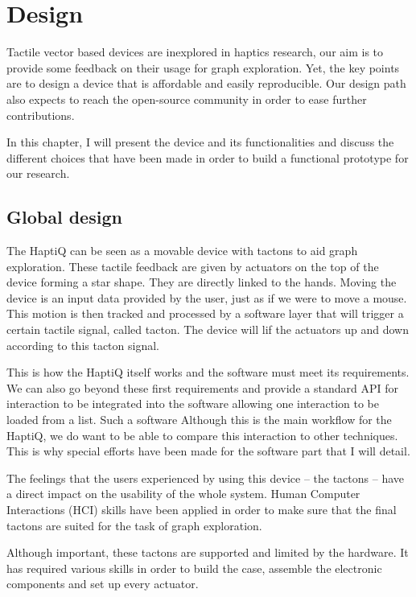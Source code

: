 \chapter{Design}

Tactile vector based devices are inexplored in haptics research, our aim is to provide some feedback on their usage for graph exploration. Yet, the key points are to design a device that is affordable and easily reproducible. Our design path also expects to reach the open-source community in order to ease further contributions.

In this chapter, I will present the device and its functionalities and discuss the different choices that have been made in order to build a functional prototype for our research.

\section{Global design}\label{global-design}

The HaptiQ can be seen as a movable device with tactons to aid graph
exploration. These tactile feedback are given by actuators on the top of
the device forming a star shape. They are directly linked to the hands.
Moving the device is an input data provided by the user, just as if we
were to move a mouse. This motion is then tracked and processed by a
software layer that will trigger a certain tactile signal, called
tacton. The device will lif the actuators up and down according to this
tacton signal.

This is how the HaptiQ itself works and the software must meet its
requirements. We can also go beyond these first requirements and provide
a standard API for interaction to be integrated into the software
allowing one interaction to be loaded from a list. Such a software
Although this is the main workflow for the HaptiQ, we do want to be able
to compare this interaction to other techniques. This is why special
efforts have been made for the software part that I will detail.

The feelings that the users experienced by using this device -- the
tactons -- have a direct impact on the usability of the whole system.
Human Computer Interactions (HCI) skills have been applied in order to
make sure that the final tactons are suited for the task of graph
exploration.

Although important, these tactons are supported and limited by the
hardware. It has required various skills in order to build the case,
assemble the electronic components and set up every actuator.

